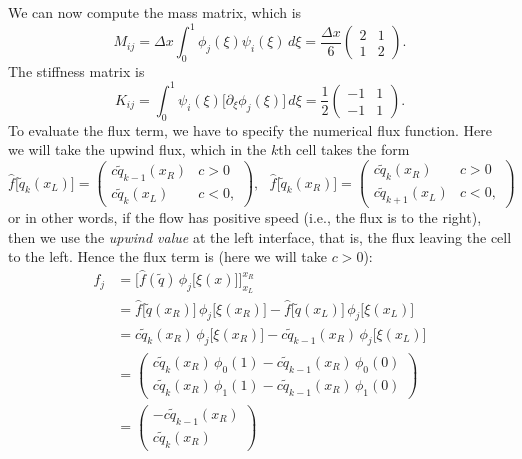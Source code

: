 \documentclass[12pt]{article}
\numberwithin{equation}{section}
\begin{document}
We can now compute the mass matrix, which is
\begin{equation}
M_{ij} = \Delta x \int_0^1 \phi_j(\xi) \psi_i(\xi) \, d\xi = \frac{\Delta x}{6}
\begin{pmatrix}
2 & 1 \\
1 & 2
\end{pmatrix}.
\end{equation}
The stiffness matrix is
\begin{equation}
K_{ij} = \int_0^1 \psi_i(\xi) \big[ \partial_\xi \phi_j(\xi) \big] \, d\xi = \frac{1}{2}
\begin{pmatrix}
-1 & 1 \\
-1 & 1
\end{pmatrix}.
\end{equation}
To evaluate the flux term, we have to specify the numerical flux function.
Here we will take the upwind flux, which in the $k$th cell takes the form
\begin{equation}
\hat{f}\big[ \tilde{q}_{k}(x_L) \big] =
\begin{pmatrix}
c \tilde{q}_{k-1}(x_R) & c > 0 \\
c \tilde{q}_{k}(x_L)   & c < 0,
\end{pmatrix}, ~~~
\hat{f}\big[ \tilde{q}_{k}(x_R) \big] =
\begin{pmatrix}
c \tilde{q}_{k}(x_R) & c > 0 \\
c \tilde{q}_{k+1}(x_L)   & c < 0,
\end{pmatrix}
\end{equation}
or in other words, if the flow has positive speed (i.e., the flux is to the right), then we use the \textit{upwind value} at the left interface, that is, the flux leaving the cell to the left.
Hence the flux term is (here we will take $c > 0$):
\begin{equation}
\begin{aligned}
f_j &= \Big[ \hat{f}(\tilde{q}) \, \phi_j\big[ \xi(x) \big] \Big]^{x_R}_{x_L} \\
&= \hat{f}\big[ \tilde{q}(x_R) \big] \, \phi_j\big[ \xi(x_R) \big]  - \hat{f}\big[ \tilde{q}(x_L) \big] \, \phi_j\big[ \xi(x_L) \big] \\
&= c \tilde{q}_{k}(x_R) \, \phi_j\big[ \xi(x_R) \big]  - c \tilde{q}_{k-1}(x_R) \, \phi_j\big[ \xi(x_L) \big] \\
&=
\begin{pmatrix}
c \tilde{q}_{k}(x_R) \, \phi_0(1)  - c \tilde{q}_{k-1}(x_R) \, \phi_0(0) \\
c \tilde{q}_{k}(x_R) \, \phi_1(1)  - c \tilde{q}_{k-1}(x_R) \, \phi_1(0)
\end{pmatrix} \\
&=
\begin{pmatrix}
- c \tilde{q}_{k-1}(x_R) \\
c \tilde{q}_{k}(x_R)
\end{pmatrix}
\end{aligned}
\end{equation}
\end{document}
